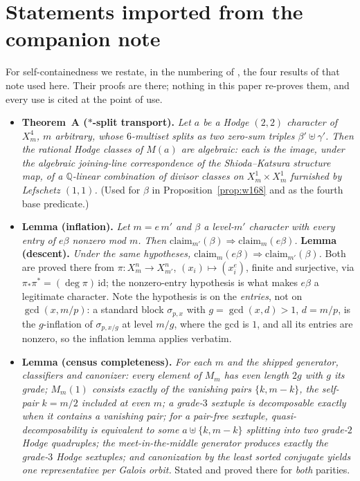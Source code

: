 \documentclass[11pt]{amsart}
\theoremstyle{remark}
\newcommand{\Q}{\mathbb{Q}}
\begin{document}
\section{Statements imported from the companion note}\label{app:bn}

For self-containedness we restate, in the numbering of \cite{BN}, the four results of that note
used here. Their proofs are there; nothing in this paper re-proves them, and every use is cited
at the point of use.

\begin{itemize}
\item[--] \textbf{Theorem~A ($*$-split transport).} \emph{Let $a$ be a Hodge $(2,2)$ character
of $X^4_m$, $m$ arbitrary, whose $6$-multiset splits as two zero-sum triples
$\beta'\uplus\gamma'$. Then the rational Hodge classes of $M(a)$ are algebraic: each is the
image, under the algebraic joining-line correspondence of the Shioda--Katsura structure map, of a
$\Q$-linear combination of divisor classes on $X^1_m\times X^1_m$ furnished by Lefschetz
$(1,1)$.} (Used for $\beta$ in Proposition~\ref{prop:w168} and as the fourth base predicate.)
\item[--] \textbf{Lemma (inflation).} \emph{Let $m=e\,m'$ and $\beta$ a level-$m'$ character
with every entry of $e\beta$ nonzero mod $m$. Then
$\mathrm{claim}_{m'}(\beta)\Rightarrow\mathrm{claim}_m(e\beta)$.} \textbf{Lemma (descent).}
\emph{Under the same hypotheses,
$\mathrm{claim}_m(e\beta)\Rightarrow\mathrm{claim}_{m'}(\beta)$.} Both are proved there from
$\pi\colon X^n_m\to X^n_{m'}$, $(x_i)\mapsto(x_i^e)$, finite and surjective, via
$\pi_*\pi^*=(\deg\pi)\,\mathrm{id}$; the nonzero-entry hypothesis is what makes $e\beta$ a
legitimate character. Note the hypothesis is on the \emph{entries}, not on $\gcd(x,m/p)$: a
standard block $\sigma_{p,x}$ with $g=\gcd(x,d)>1$, $d=m/p$, is the $g$-inflation of
$\sigma_{p,x/g}$ at level $m/g$, where the gcd is $1$, and all its entries are nonzero, so the
inflation lemma applies verbatim.
\item[--] \textbf{Lemma (census completeness).} \emph{For each $m$ and the shipped generator,
classifiers and canonizer: every element of $M_m$ has even length $2g$ with $g$ its grade;
$M_m(1)$ consists exactly of the vanishing pairs $\{k,m-k\}$, the self-pair $k=m/2$ included at
even $m$; a grade-$3$ sextuple is decomposable exactly when it contains a vanishing pair; for a
pair-free sextuple, quasi-decomposability is equivalent to some $a\uplus\{k,m-k\}$ splitting
into two grade-$2$ Hodge quadruples; the meet-in-the-middle generator produces exactly the
grade-$3$ Hodge sextuples; and canonization by the least sorted conjugate yields one
representative per Galois orbit.} Stated and proved there for \emph{both} parities.
\end{itemize}
\end{document}
